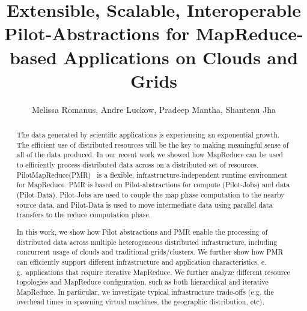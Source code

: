 \documentclass[times]{cpeauth}
\newcommand{\pilotmapreduce}{PilotMapReduce\xspace}
\begin{document}

\title{Extensible, Scalable, Interoperable Pilot-Abstractions for MapReduce-based Applications on Clouds and Grids}

\author{Melissa Romanus, Andre Luckow, Pradeep Mantha, Shantenu Jha\corrauth}

\address{Radical Research Group, Rutgers University}


\begin{abstract}

The data generated by scientific applications is experiencing an exponential
growth. The efficient use of distributed resources will be the key to making
meaningful sense of all of the data produced. In our recent work we showed how
MapReduce can be used to efficiently process distributed data across on a
distributed set of resources. \pilotmapreduce (PMR)~\cite{Mantha:2012:PEF:2287016.2287020} is a flexible,
infrastructure-independent runtime environment for MapReduce. PMR is based on
Pilot-abstractions for compute (Pilot-Jobs) and data (Pilot-Data). Pilot-Jobs
are used to couple the map phase computation to the nearby source data, and
Pilot-Data is used to move intermediate data using parallel data transfers to
the reduce computation phase.

In this work, we show how Pilot abstractions and PMR enable the processing of
distributed data across multiple heterogeneous distributed infrastructure,
including concurrent usage of clouds and traditional grids/clusters. We 
further show how PMR can efficiently support different infrastructure 
and application characteristics, e.\,g.\ applications that
require iterative MapReduce. We further analyze different resource topologies
and MapReduce configuration, such as both hierarchical and iterative 
MapReduce. In particular, we investigate typical infrastructure trade-offs 
(e.g. the overhead times in spawning virtual machines, the
geographic distribution, etc). 

\end{abstract}


\maketitle
\end{document}
